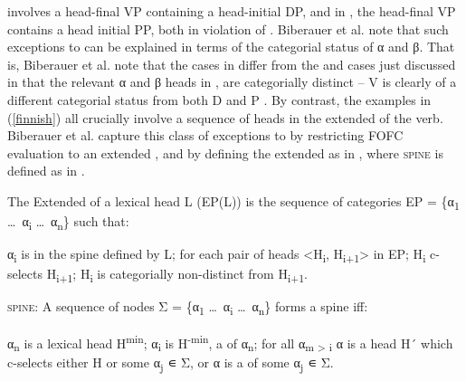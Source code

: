 \documentclass[output=paper]{langscibook}
\begin{document}
 involves a head-final VP containing a head-initial DP, and in , the head-final VP contains a head initial PP, both in violation of \protect{}. Biberauer et al. note that such exceptions to \protect{} can be explained in terms of the categorial status of α and β.  That is, Biberauer et al. note that the cases in  differ from the  and  cases just discussed in that the relevant α and β heads in , are categorially distinct -- V is clearly of a different categorial status from both D  and P .  By contrast, the  examples in (\protect\ref{finnish}) all crucially involve a sequence of heads in the extended  of the verb.   Biberauer et al. capture this class of exceptions to \protect{} by restricting FOFC evaluation to an extended , and by defining the extended  as in , where \textsc{spine} is defined as in .

\noindent\parbox{\textwidth}{\ea \label{ex:haddican:6} The Extended  of a lexical head L (EP(L)) is the sequence of categories EP = \{α\textsubscript{1} \ldots\ α\textsubscript{i} \ldots\ α\textsubscript{n}\} such that:  \protect\label{fofc4}
\begin{xlisti}
\ex  α\textsubscript{i} is in the spine defined by L; for each pair of heads <H\textsubscript{i}, H\textsubscript{i+1}> in EP;
\ex H\textsubscript{i} c-selects H\textsubscript{i+1}; 
\ex H\textsubscript{i} is categorially non-distinct from H\textsubscript{i+1}.
\end{xlisti}
\z}

\noindent\parbox{\textwidth}{\ea \label{ex:haddican:7} \textsc{spine:} A sequence of nodes Σ = \{α\textsubscript{1} \ldots\ α\textsubscript{i} \ldots\ α\textsubscript{n}\} 
forms a spine iff:  \protect\label{fofc5}
\begin{xlisti}
\ex \label{ex:haddican:7a} α\textsubscript{n} is a lexical head H\textsuperscript{min};
\ex \label{ex:haddican:7b} α\textsubscript{i} is H\textsuperscript{-min}, a  of α\textsubscript{n};
\ex  for all α\textsubscript{m > i}  α is a head H´ which c-selects either H or some α\textsubscript{j} ∊ Σ, or α is a  of some α\textsubscript{j} ∊ Σ.
\end{xlisti}\z}
\end{document}
